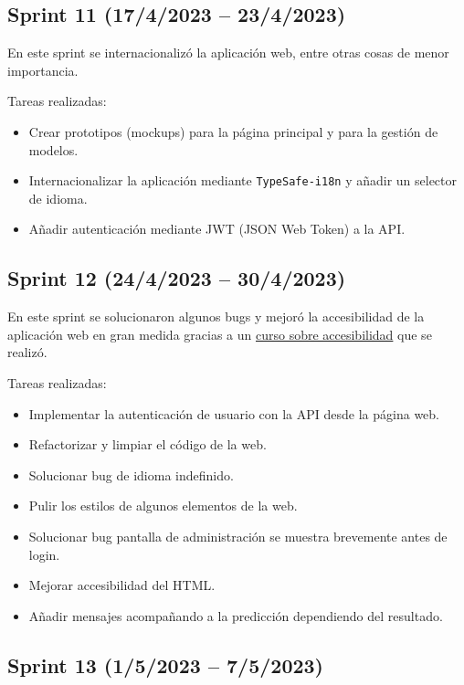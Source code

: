 \subsection{Sprint 11 (17/4/2023 -- 23/4/2023)}

En este sprint se internacionalizó la aplicación web, entre otras cosas de menor
importancia.

Tareas realizadas:

\begin{itemize}
    \item Crear prototipos (mockups) para la página principal y para la gestión
    de modelos.
    \item Internacionalizar la aplicación mediante \texttt{TypeSafe-i18n} y
    añadir un selector de idioma.
    \item Añadir autenticación mediante JWT (JSON Web Token) a la API.
\end{itemize}

\subsection{Sprint 12 (24/4/2023 -- 30/4/2023)}

En este sprint se solucionaron algunos bugs y mejoró la accesibilidad de la
aplicación web en gran medida gracias a un
\href{https://www.udacity.com/course/web-accessibility--ud891}{curso sobre
accesibilidad} que se realizó.

Tareas realizadas:

\begin{itemize}
    \item Implementar la autenticación de usuario con la API desde la página web.
    \item Refactorizar y limpiar el código de la web.
    \item Solucionar bug de idioma indefinido.
    \item Pulir los estilos de algunos elementos de la web.
    \item Solucionar bug pantalla de administración se muestra brevemente antes
    de login.
    \item Mejorar accesibilidad del HTML.
    \item Añadir mensajes acompañando a la predicción dependiendo del resultado.
\end{itemize}

\subsection{Sprint 13 (1/5/2023 -- 7/5/2023)}

